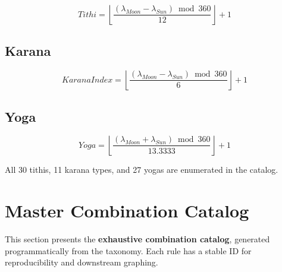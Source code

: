 \documentclass[
  11pt,
  a4paper,
  oneside,
  openany]{article}
\begin{document}
\[
Tithi = \left\lfloor \frac{(\lambda_{Moon}-\lambda_{Sun}) \bmod 360}{12} \right\rfloor + 1
\]

\subsection{Karana}\label{karana}

\[
KaranaIndex = \left\lfloor \frac{(\lambda_{Moon}-\lambda_{Sun}) \bmod 360}{6} \right\rfloor + 1
\]

\subsection{Yoga}\label{yoga}

\[
Yoga = \left\lfloor \frac{(\lambda_{Moon}+\lambda_{Sun}) \bmod 360}{13.3333} \right\rfloor + 1
\]

All 30 tithis, 11 karana types, and 27 yogas are enumerated in the
catalog.

\section{Master Combination Catalog}\label{master-combination-catalog}

This section presents the \textbf{exhaustive combination catalog},
generated programmatically from the taxonomy. Each rule has a stable ID
for reproducibility and downstream graphing.
\end{document}
